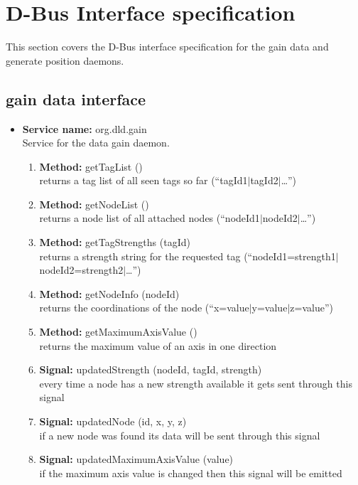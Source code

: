  \section{D-Bus Interface specification}
  This section covers the D-Bus interface specification for the gain data and generate position daemons.

  \subsection{gain data interface}
   \begin{itemize}
    \item \textbf{Service name:} org.dld.gain\\
     Service for the data gain daemon.
     \begin{enumerate}
      \item \textbf{Method:} getTagList ()\\
       returns a tag list of all seen tags so far (``tagId1$|$tagId2$|$\dots'')
      \item \textbf{Method:} getNodeList ()\\
       returns a node list of all attached nodes (``nodeId1$|$nodeId2$|$\dots'')
      \item \textbf{Method:} getTagStrengths (tagId)\\
       returns a strength string for the requested tag (``nodeId1=strength1$|$ nodeId2=strength2$|$\dots'')
      \item \textbf{Method:} getNodeInfo (nodeId)\\
       returns the coordinations of the node (``x=value$|$y=value$|$z=value'')
      \item \textbf{Method:} getMaximumAxisValue ()\\
       returns the maximum value of an axis in one direction
      \item \textbf{Signal:} updatedStrength (nodeId, tagId, strength)\\
       every time a node has a new strength available it gets sent through this signal
      \item \textbf{Signal:} updatedNode (id, x, y, z)\\
       if a new node was found its data will be sent through this signal
      \item \textbf{Signal:} updatedMaximumAxisValue (value)\\
       if the maximum axis value is changed then this signal will be emitted
     \end{enumerate}

\end{itemize}

